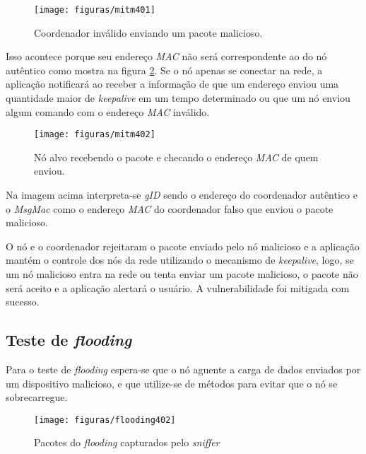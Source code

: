 \begin{figure}[ht]
    \centering
    \caption{Coordenador inv\'alido enviando um pacote malicioso.}
    \texttt{[image: figuras/mitm401]}
    \label{fig:4mitm}
\end{figure}

\par Isso acontece porque seu endere\c{c}o \emph{MAC} n\~ao ser\'a correspondente ao do n\'o aut\^entico como mostra na figura \ref{fig:4mitm2}. Se o n\'o apenas se conectar na rede, a aplica\c{c}\~ao notificar\'a ao receber a informa\c{c}\~ao de que um endere\c{c}o enviou uma quantidade maior de \emph{keepalive} em um tempo determinado ou que um n\'o enviou algum comando com o endere\c{c}o \emph{MAC} inv\'alido.

\begin{figure}[H]
    \centering
    \caption{N\'o alvo recebendo o pacote e checando o endere\c{c}o \emph{MAC} de quem enviou.}
    \texttt{[image: figuras/mitm402]}
    \label{fig:4mitm2}
\end{figure}

\par Na imagem acima interpreta-se \emph{gID} sendo o endere\c{c}o do coordenador aut\^entico e o \emph{MsgMac} como o endere\c{c}o \emph{MAC} do coordenador falso que enviou o pacote malicioso.

\par O n\'o e o coordenador rejeitaram o pacote enviado pelo n\'o malicioso e a aplica\c{c}\~ao mant\'em o controle dos n\'os da rede utilizando o mecanismo de \emph{keepalive}, logo, se um n\'o malicioso entra na rede ou tenta enviar um pacote malicioso, o pacote n\~ao ser\'a aceito e a aplica\c{c}\~ao alertar\'a o usu\'ario. A vulnerabilidade foi mitigada com sucesso.

\subsection{Teste de \emph{flooding}}
\par Para o teste de \emph{flooding} espera-se que o n\'o aguente a carga de dados enviados por um dispositivo malicioso, e que utilize-se de m\'etodos para evitar que o n\'o se sobrecarregue.

\begin{figure}[H]
    \centering
    \caption{Pacotes do \emph{flooding} capturados pelo \emph{sniffer}}
    \texttt{[image: figuras/flooding402]}
    \label{fig:4floodingwire}
\end{figure}

